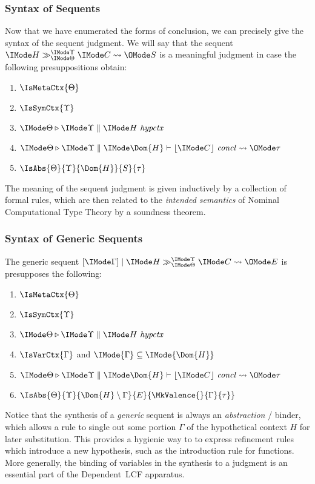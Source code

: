 \subsubsection{Syntax of Sequents}

Now that we have enumerated the forms of conclusion, we can precisely give the
syntax of the sequent judgment. We will say that the sequent
$\PRLSequent{H}{\Theta}{\Upsilon}{C}{S}$ is a meaningful judgment in
case the following presuppositions obtain:
\begin{enumerate}
  \item $\IsMetaCtx{\Theta}$
  \item $\IsSymCtx{\Upsilon}$
  \item $\IsHypCtx{\Theta}{\Upsilon}{H}$
  \item $\IsConcl{\Theta}{\Upsilon}{\Dom{H}}{C}{\tau}$
  \item $\IsAbs{\Theta}{\Upsilon}{\Dom{H}}{S}{\tau}$
\end{enumerate}

The meaning of the sequent judgment is given inductively by a collection of
formal rules, which are then related to the \emph{intended semantics} of
Nominal Computational Type Theory by a soundness theorem.

\subsubsection{Syntax of Generic Sequents}

The generic sequent $\GenericPRLSequent{\Gamma}{H}{\Theta}{\Upsilon}{C}{E}$ is presupposes the following:
\begin{enumerate}
  \item $\IsMetaCtx{\Theta}$
  \item $\IsSymCtx{\Upsilon}$
  \item $\IsHypCtx{\Theta}{\Upsilon}{H}$
  \item $\IsVarCtx{\Gamma}$ and $\IMode{\Gamma}\subseteq\IMode{\Dom{H}}$
  \item $\IsConcl{\Theta}{\Upsilon}{\Dom{H}}{C}{\tau}$
  \item $\IsAbs{\Theta}{\Upsilon}{\Dom{H}\setminus\Gamma}{E}{\MkValence{}{\Gamma}{\tau}}$
\end{enumerate}

Notice that the synthesis of a \emph{generic} sequent is always an \emph{abstraction}
/ binder, which allows a rule to single out some portion $\Gamma$ of the
hypothetical context $H$ for later substitution. This provides a hygienic way
to to express refinement rules which introduce a new hypothesis, such as the
introduction rule for functions. More generally, the binding of
variables in the synthesis to a judgment is an essential part of the
Dependent~LCF apparatus.

